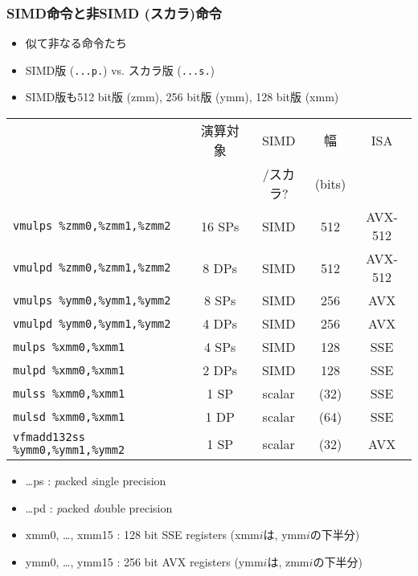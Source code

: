 \documentclass[10pt,dvipdfmx]{beamer}
\newcommand{\ao}[1]{{\color{blue}#1}}
\begin{document}
\begin{frame}
  \frametitle{SIMD命令と非SIMD (スカラ)命令}
  \begin{itemize}
  \item 似て非なる命令たち
  \item SIMD版 (\texttt{\ao{...p.}}) vs. スカラ版 (\texttt{\ao{...s.}})
  \item SIMD版も512 bit版 (zmm), 256 bit版 (ymm), 128 bit版 (xmm)
  \end{itemize}
\begin{center}
{\footnotesize
\begin{tabular}{|l|c|c|c|c|}\hline
                     & 演算対象 & SIMD    & 幅     & ISA \\
                     &          & /スカラ? & (bits) &     \\
\hline
{\tt \ao{v}mulps \%zmm0,\%zmm1,\%zmm2} & 16 SPs & SIMD     & 512 & AVX-512 \\
{\tt vmul\ao{pd} \%zmm0,\%zmm1,\%zmm2} & 8 DPs & SIMD     & 512  & AVX-512 \\
{\tt \ao{v}mulps \%ymm0,\%ymm1,\%ymm2} & 8 SPs & SIMD     & 256  & AVX \\
{\tt vmul\ao{pd} \%ymm0,\%ymm1,\%ymm2} & 4 DPs & SIMD     & 256  & AVX \\
{\tt  mulps \ao{\%xmm0},\%xmm1} & 4 SPs     & SIMD        & 128  & SSE \\
{\tt  mulpd \%xmm0,\%xmm1} & 2 DPs     & SIMD        & 128  & SSE \\
{\tt  mul\ao{ss} \%xmm0,\%xmm1} & 1 SP      & scalar        & (32) & SSE \\
{\tt  mul\ao{sd} \%xmm0,\%xmm1} & 1 DP      & scalar        & (64) & SSE \\
{\tt  vfmadd132\ao{ss} \%ymm0,\%ymm1,\%ymm2} & 1 SP & scalar   & (32) & AVX \\
\hline
\end{tabular}}
\end{center}

\begin{itemize}
\item \ldots ps : \ao{\em p}acked \ao{\em s}ingle precision
\item \ldots pd : \ao{\em p}acked \ao{\em d}ouble precision
\item {\footnotesize xmm0, \ldots , xmm15 : 128 bit SSE registers 
  (xmm$i$は, ymm$i$の下半分)}
\item {\footnotesize ymm0, \ldots , ymm15 : 256 bit AVX registers 
  (ymm$i$は, zmm$i$の下半分)}
\end{itemize}
\end{frame}
\end{document}
